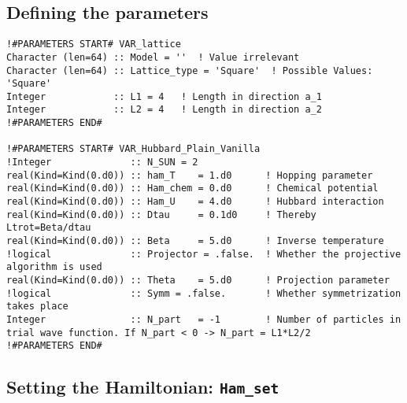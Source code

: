 \subsection{Defining the parameters}

\begin{lstlisting}[style=fortran]
!#PARAMETERS START# VAR_lattice
Character (len=64) :: Model = ''  ! Value irrelevant
Character (len=64) :: Lattice_type = 'Square'  ! Possible Values: 'Square'
Integer            :: L1 = 4   ! Length in direction a_1
Integer            :: L2 = 4   ! Length in direction a_2
!#PARAMETERS END#

!#PARAMETERS START# VAR_Hubbard_Plain_Vanilla
!Integer              :: N_SUN = 2
real(Kind=Kind(0.d0)) :: ham_T    = 1.d0      ! Hopping parameter
real(Kind=Kind(0.d0)) :: Ham_chem = 0.d0      ! Chemical potential
real(Kind=Kind(0.d0)) :: Ham_U    = 4.d0      ! Hubbard interaction
real(Kind=Kind(0.d0)) :: Dtau     = 0.1d0     ! Thereby Ltrot=Beta/dtau
real(Kind=Kind(0.d0)) :: Beta     = 5.d0      ! Inverse temperature
!logical              :: Projector = .false.  ! Whether the projective algorithm is used
real(Kind=Kind(0.d0)) :: Theta    = 5.d0      ! Projection parameter
!logical              :: Symm = .false.       ! Whether symmetrization takes place
Integer               :: N_part   = -1        ! Number of particles in trial wave function. If N_part < 0 -> N_part = L1*L2/2
!#PARAMETERS END#
\end{lstlisting}

\subsection{Setting the Hamiltonian:  \texttt{Ham\_set} }

